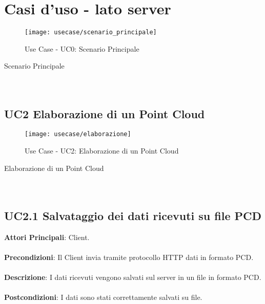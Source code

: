 \section{Casi d'uso - lato server}
\begin{figure}[!h] 
    \centering 
    \texttt{[image: usecase/scenario\_principale]} 
    \caption{Use Case - UC0: Scenario Principale}
\end{figure}

\begin{usecase}{0}{Scenario Principale}
\\ 
\\ 
\\ 
\label{uc:scenario_principale}
\end{usecase}

\subsection{UC2 Elaborazione di un Point Cloud}
\begin{figure}[!h] 
    \centering 
    \texttt{[image: usecase/elaborazione]} 
    \caption{Use Case - UC2: Elaborazione di un Point Cloud}
\end{figure}

\begin{usecase}{2}{Elaborazione di un Point Cloud}
\\ 
\\ 
\\ 
\label{uc:elaborazione}
\end{usecase}

\subsection{UC2.1 Salvataggio dei dati ricevuti su file PCD}
\textbf{Attori Principali}: Client.
\\\\ \textbf{Precondizioni}: Il Client invia tramite protocollo HTTP dati in formato PCD.
\\\\ \textbf{Descrizione}: I dati ricevuti vengono salvati sul server in un file in formato PCD.
\\\\ \textbf{Postcondizioni}: I dati sono stati correttamente salvati su file.

